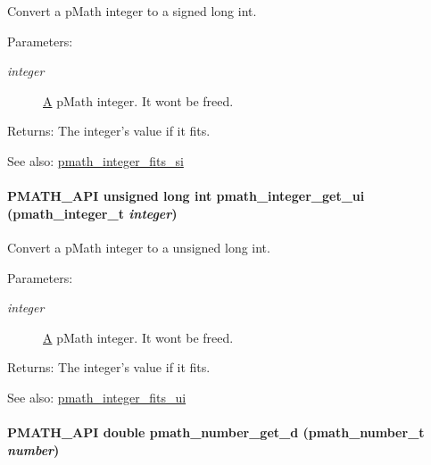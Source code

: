 Convert a pMath integer to a signed long int. 

\begin{Desc}
\item[Parameters:]
\begin{description}
\item[{\em integer}]\hyperlink{class_a}{A} pMath integer. It wont be freed. \end{description}
\end{Desc}
\begin{Desc}
\item[Returns:]The integer's value if it fits.\end{Desc}
\begin{Desc}
\item[See also:]\hyperlink{group__numbers_gc220e06754067b9ba4a7c823017ad32e}{pmath\_\-integer\_\-fits\_\-si} \end{Desc}
\hypertarget{group__numbers_g0aed3b6f38410b7e42ffa52be73c6ea6}{
\paragraph[{pmath\_\-integer\_\-get\_\-ui}]{\setlength{\rightskip}{0pt plus 5cm}PMATH\_\-API unsigned long int pmath\_\-integer\_\-get\_\-ui ({\bf pmath\_\-integer\_\-t} {\em integer})}\hfill}
\label{group__numbers_g0aed3b6f38410b7e42ffa52be73c6ea6}


Convert a pMath integer to a unsigned long int. 

\begin{Desc}
\item[Parameters:]
\begin{description}
\item[{\em integer}]\hyperlink{class_a}{A} pMath integer. It wont be freed. \end{description}
\end{Desc}
\begin{Desc}
\item[Returns:]The integer's value if it fits.\end{Desc}
\begin{Desc}
\item[See also:]\hyperlink{group__numbers_gb12e5e34b7918cb6beee23c57cdd0d36}{pmath\_\-integer\_\-fits\_\-ui} \end{Desc}
\hypertarget{group__numbers_g62617cbeeedaff88caaafec1dc84f329}{
\paragraph[{pmath\_\-number\_\-get\_\-d}]{\setlength{\rightskip}{0pt plus 5cm}PMATH\_\-API double pmath\_\-number\_\-get\_\-d ({\bf pmath\_\-number\_\-t} {\em number})}\hfill}
\label{group__numbers_g62617cbeeedaff88caaafec1dc84f329}


